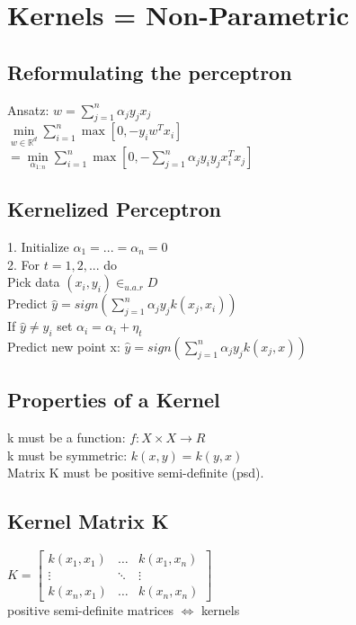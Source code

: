 \section*{Kernels = Non-Parametric}
\subsection*{Reformulating the perceptron}
Ansatz: $w=\sum_{j=1}^n \alpha_j y_j x_j$\\
$\min \limits_{w\in\mathbb{R}^d} \sum_{i=1}^n \max [0, -y_i w^T x_i]$\\
$= \min \limits_{\alpha_{1:n}} \sum_{i=1}^n \max  [0,- \sum_{j=1}^n \alpha_j y_i y_j x_i^T x_j ]$


\subsection*{Kernelized Perceptron}
1. Initialize $\alpha_1 = ... = \alpha_n = 0$\\
2. For $t = 1, 2, ...$ do \\
Pick data $(x_i,y_i) \in_{u.a.r} D$\\
Predict $\hat{y} = sign(\sum_{j=1}^n \alpha_j y_j k(x_j,x_i))$\\
If $\hat{y} \not = y_i$ set $\alpha_i = \alpha_i + \eta_t$\\
Predict new point x: $\hat{y} = sign(\sum_{j=1}^n \alpha_j y_j k(x_j,x))$

\subsection*{Properties of a Kernel}
k must be a function: $f: X \times X \rightarrow R$\\
k must be symmetric: $k(x,y) = k(y,x)$\\
Matrix K must be positive semi-definite (psd).

\subsection*{Kernel Matrix K}
$K = 
\begin{bmatrix}
	k(x_1,x_1) & \dots & k(x_1,x_n) \\
	\vdots & \ddots & \vdots \\
	k(x_n, x_1) & \dots & k(x_n,x_n)
\end{bmatrix}$\\
positive semi-definite matrices $\Leftrightarrow$ kernels

